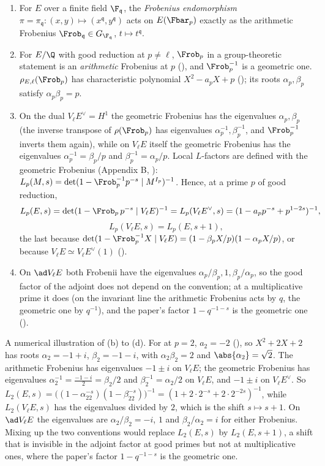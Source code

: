 \begin{convention}[Frobenius]\label{conv:ellcurves:frobenius}
\leavevmode
\begin{enumerate}[label=(\alph*)]
\item For $E$ over a finite field $\F_{\mathfrak q}$, the \emph{Frobenius endomorphism} $\pi=\pi_{\mathfrak q}\colon(x,y)\mapsto(x^{\mathfrak q},y^{\mathfrak q})$ acts on $E(\Fbar_p)$ exactly as the
arithmetic Frobenius $\Frob_{\mathfrak q}\in G_{\F_{\mathfrak q}}$, $t\mapsto t^{\mathfrak q}$.
\item For $E/\Q$ with good reduction at $p\ne\ell$, $\Frob_p$ in a group-theoretic statement is an \emph{arithmetic} Frobenius at $p$ (), and $\Frob_p^{-1}$ is a
geometric one. $\rho_{E,\ell}(\Frob_p)$ has characteristic polynomial $X^2-a_pX+p$ (); its roots $\alpha_p,\beta_p$ satisfy $\alpha_p\beta_p=p$.
\item On the dual $V_\ell E^\vee=H^1$ the geometric Frobenius has the eigenvalues $\alpha_p,\beta_p$ (the inverse transpose of $\rho(\Frob_p)$ has eigenvalues
$\alpha_p^{-1},\beta_p^{-1}$, and $\Frob_p^{-1}$ inverts them again), while on $V_\ell E$ itself the geometric Frobenius has the eigenvalues $\alpha_p^{-1}=\beta_p/p$ and
$\beta_p^{-1}=\alpha_p/p$. Local $L$-factors are defined with the geometric Frobenius (Appendix B, ): $L_p(M,s)=\det(1-\Frob_p^{-1}p^{-s}\mid M^{I_p})^{-1}$.
Hence, at a prime $p$ of good reduction,
\[
L_p(E,s)=\det(1-\Frob_p\,p^{-s}\mid V_\ell E)^{-1}=L_p(V_\ell E^\vee,s)=(1-a_pp^{-s}+p^{1-2s})^{-1},
\]
\[
L_p(V_\ell E,s)=L_p(E,s+1),
\]
the last because $\det(1-\Frob_p^{-1}X\mid V_\ell E)=(1-\beta_pX/p)(1-\alpha_pX/p)$, or because $V_\ell E\simeq V_\ell E^\vee(1)$ ().
\item On $\ad V_\ell E$ both Frobenii have the eigenvalues $\alpha_p/\beta_p,1,\beta_p/\alpha_p$, so the good factor of the adjoint does not depend on the convention; at a
multiplicative prime it does (on the invariant line the arithmetic Frobenius acts by $q$, the geometric one by $q^{-1}$), and the paper's factor $1-q^{-1-s}$ is
the geometric one ().
\end{enumerate}
\end{convention}

A numerical illustration of (b) to (d). For  at $p=2$, $a_2=-2$ (), so $X^2+2X+2$ has roots $\alpha_2=-1+i$, $\beta_2=-1-i$, with
$\alpha_2\beta_2=2$ and $\abs{\alpha_2}=\sqrt2$. The arithmetic Frobenius has eigenvalues $-1\pm i$ on $V_\ell E$; the geometric Frobenius has eigenvalues
$\alpha_2^{-1}=\frac{-1-i}2=\beta_2/2$ and $\beta_2^{-1}=\alpha_2/2$ on $V_\ell E$, and $-1\pm i$ on $V_\ell E^\vee$. So
$L_2(E,s)=\bigl((1-\alpha_22^{-s})(1-\beta_22^{-s})\bigr)^{-1}=(1+2\cdot2^{-s}+2\cdot2^{-2s})^{-1}$, while $L_2(V_\ell E,s)$ has the eigenvalues divided by $2$, which is the shift
$s\mapsto s+1$. On $\ad V_\ell E$ the eigenvalues are $\alpha_2/\beta_2=-i$, $1$ and $\beta_2/\alpha_2=i$ for either Frobenius. Mixing up the two conventions would replace $L_2(E,s)$ by
$L_2(E,s+1)$, a shift that is invisible in the adjoint factor at good primes but not at multiplicative ones, where the paper's factor $1-q^{-1-s}$ is the geometric one.


